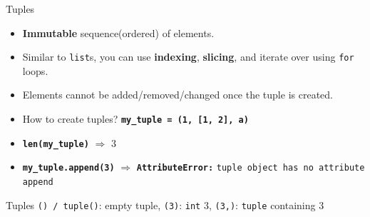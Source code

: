     \begin{frame}{Tuples}
        \LARGE
        \begin{itemize}
            \item \textbf{Immutable} sequence(ordered) of elements.
            \item Similar to \texttt{list}s, you can use \textbf{indexing}, \textbf{slicing}, and iterate over using \texttt{for} loops.
            \item Elements cannot be added/removed/changed once the tuple is created.
            \item How to create tuples?
             \textbf{\texttt{my\_tuple = (1, [1, 2], \textquotesingle a\textquotesingle )}}
            \item \textbf{\texttt{len(my\_tuple)}} $\Rightarrow$
             3
            \item \textbf{\texttt{my\_tuple.append(3)}} $\Rightarrow$
             \textbf{\texttt{AttributeError:}} \texttt{\textquotesingle tuple\textquotesingle \ object has no attribute \textquotesingle append\textquotesingle}
        \end{itemize}
    \end{frame}

    \begin{frame}{Tuples}
        \LARGE
        \texttt{() / tuple()}: empty tuple, 
         \texttt{(3)}:
         \texttt{int} 3,
         \texttt{(3,)}:
         \texttt{tuple} containing 3
        \inputminted[frame=single,framesep=2pt]{python3}{../Lecture6/code-examples/tuples.py}
    \end{frame}

